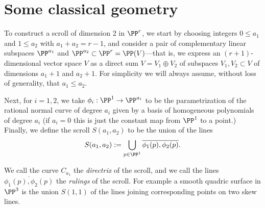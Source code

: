 \section{Some classical geometry}\label{daily name}

To construct a scroll of dimension 2 in $\PP^r$, we start by choosing integers $0\leq a_1$ and  $1\leq a_2$ with $a_1 + a_2 = r-1$, and consider  a pair of complementary linear subspaces $\PP^{a_1}$ and $\PP^{a_2} \subset \PP^r = \PP(V)$---that is, we express an $(r+1)$-dimensional vector space $V$ as a direct sum $V =  V_1 \oplus V_2$ of subspaces $V_1, V_2 \subset V$ of dimensions $a_1+1$ and $a_2+1$. For simplicity we will always assume, without loss of
generality, that $a_{1}\leq a_{2}$.

Next, for $i=1,2$, we take $\phi_i : \PP^1 \to \PP^{a_i}$ to be the parametrization of the rational normal curve of degree $a_i$ given by a basis of homogeneous polynomials of degree $a_i$ (if $a_i = 0$ this is just the constant map from $\PP^1$ to a point.) Finally, we define the scroll $S(a_1, a_2)$ to be the union of the lines
$$
S(a_1,a_2) := \bigcup_{p\in \PP^1} \overline{\phi_1(p), \phi_2(p)}.
$$

We call the curve $C_{a_{1}}$ the \emph{directrix} of the scroll, and we call the lines $ \overline{\phi_1(p), \phi_2(p)}$ the \emph{rulings} of the scroll. For example a smooth quadric surface in $\PP^3$ is the union $S(1,1)$ of the lines joining corresponding points on two skew lines. 


